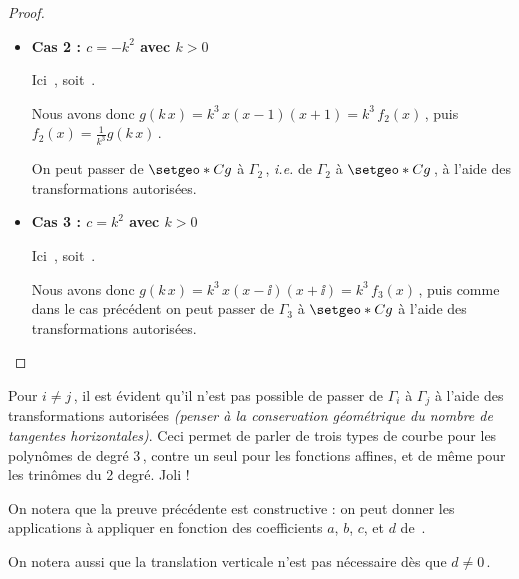 \begin{proof}
\begin{enumerate}
\begin{itemize}
			\item \textbf{Cas 2 : $c = - k^2$ avec $k > 0$}
		
			\smallskip
			\noindent
			Ici
			\,,
			soit
			\,.
		
			\smallskip
			\noindent
			Nous avons donc $g(k \, x) = k^3 \, x(x - 1)(x + 1) = k^3 \, f_2(x)$\,,
			puis
			$f_2(x) = \frac{1}{k^3} g(k \, x)$\,.
		
			\smallskip
			\noindent
			On peut passer de $\setgeo*{C}{g}$ à $\Gamma_2$\,, \emph{i.e.} de $\Gamma_2$ à $\setgeo*{C}{g}$\,, à l'aide des transformations autorisées.


			\item \textbf{Cas 3 : $c = k^2$ avec $k > 0$}
		
			\smallskip
			\noindent
			Ici
			\,,
			soit
			\,.
		
			\smallskip
			\noindent
			Nous avons donc $g(k \, x) = k^3 \, x(x - \ii)(x + \ii) = k^3 \, f_3(x)$\,,
			puis comme dans le cas précédent on peut passer de $\Gamma_3$ à $\setgeo*{C}{g}$ à l'aide des transformations autorisées.
		\end{itemize}
	\end{enumerate}
\end{proof}




Pour $i \neq j$\,, il est évident qu'il n'est pas possible de passer de $\Gamma_i$  à $\Gamma_j$ à l'aide des transformations autorisées \emph{(penser à la conservation géométrique du nombre de tangentes horizontales)}.
Ceci permet de parler de trois types de courbe pour les polynômes de degré $3$\,, contre un seul pour les fonctions affines, et de même pour les trinômes du 2\ieme{} degré. Joli !




\begin{remark}
	On notera que la preuve précédente est constructive : on peut donner les applications à appliquer en fonction des coefficients $a$, $b$, $c$, et $d$ de \,.
\end{remark}




\begin{remark}
	On notera aussi que la translation verticale n'est pas nécessaire dès que $d \neq 0$\,.
\end{remark}
